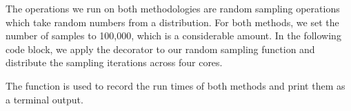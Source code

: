 \documentclass[letterpaper,10pt,english]{sphinxmanual}
\begin{document}
\begin{sphinxVerbatim}[commandchars=\\\{\}]
   
   
   
   

  
\end{sphinxVerbatim}

\sphinxAtStartPar
The operations we run on both methodologies are random sampling operations which take random numbers from a distribution.
For both methods, we set the number of samples to 100,000, which is a considerable amount.
In the following code block, we apply the  decorator to our random sampling function 
and distribute the sampling iterations across four cores.

\sphinxAtStartPar
The  function is used to record the run times of both methods and print them as a terminal output.
\end{document}
